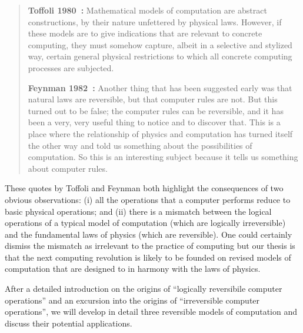 \documentclass{article}
\begin{document}
\begin{quote}
  \textbf{Toffoli 1980~\cite{toffoli:1980}:} Mathematical models of computation are
  abstract constructions, by their nature unfettered by physical
  laws. However, if these models are to give indications that are
  relevant to concrete computing, they must somehow capture, albeit in
  a selective and stylized way, certain general physical restrictions
  to which all concrete computing processes are
  subjected.

  \textbf{Feynman 1982~\cite{springerlink:10.1007/bf02650179}:}
  Another thing that has been suggested early was that natural laws
  are reversible, but that computer rules are not. But this turned out
  to be false; the computer rules can be reversible, and it has been a
  very, very useful thing to notice and to discover that. This is a
  place where the relationship of physics and computation has turned
  itself the other way and told us something about the possibilities
  of computation. So this is an interesting subject because it tells
  us something about computer rules.
\end{quote}

\noindent These quotes by Toffoli and Feynman both highlight the
consequences of two obvious observations: (i) all the operations that
a computer performs reduce to basic physical operations; and (ii)
there is a mismatch between the logical operations of a typical model
of computation (which are logically irreversible) and the fundamental
laws of physics (which are reversible). One could certainly dismiss
the mismatch as irrelevant to the practice of computing but our thesis
is that the next computing revolution is likely to be founded on
revised models of computation that are designed to in harmony with the
laws of physics.

After a detailed introduction on the origins of ``logically
reversibile computer operations'' and an excursion into the origins of
``irreversible computer operations'', we will develop in detail three
reversible models of computation and discuss their potential
applications.
\end{document}
